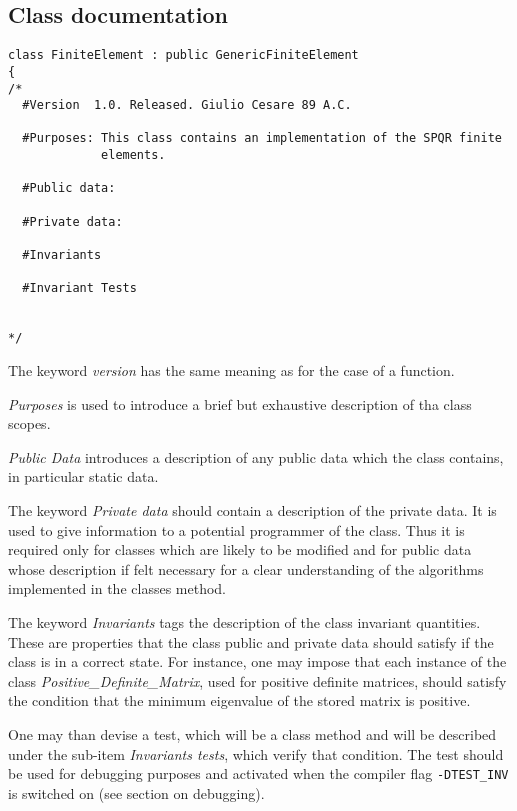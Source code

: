 \subsection{Class documentation}
\begin{verbatim}
class FiniteElement : public GenericFiniteElement
{
/*
  #Version  1.0. Released. Giulio Cesare 89 A.C.

  #Purposes: This class contains an implementation of the SPQR finite
             elements.

  #Public data:
   
  #Private data:
           
  #Invariants                

  #Invariant Tests
                  

*/
\end{verbatim}
\begin{description}
\item The keyword \emph{version} has the same meaning as for the 
case of a function.
\item \emph{Purposes} is used to introduce a brief but exhaustive
description of tha class scopes.
\item \emph{Public Data} introduces a description of any public
data which the class contains, in particular static data.
\item The keyword \emph{Private data} should contain a description of
  the private data. It is used to give information to a potential
  programmer of the class. Thus it is required only for classes which
  are likely to be modified and for public data whose description if
  felt necessary for a clear understanding of the algorithms
  implemented in the classes method.
\item The keyword \emph{Invariants} tags the description of the
  class invariant quantities. These are properties that the class
  public and private data should satisfy if the class is in a correct
  state.  For instance, one may impose that each instance of the class
  \emph{Positive\_Definite\_Matrix}, used for positive definite
  matrices, should satisfy the condition that the minimum eigenvalue
  of the stored matrix is positive.
\item One may than devise a test, which will be a class method and
  will be described under the sub-item \emph{Invariants tests},
  which verify that condition. The test should be used for debugging
  purposes and activated when the compiler flag \texttt{-DTEST\_INV} is
  switched on (see section on debugging).
\end{description}

